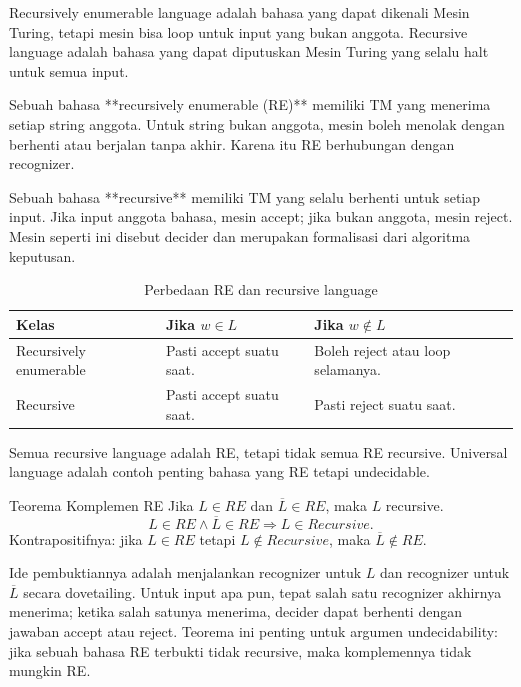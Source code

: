 \begin{jawab}
Recursively enumerable language adalah bahasa yang dapat dikenali Mesin Turing, tetapi mesin bisa loop untuk input yang bukan anggota. Recursive language adalah bahasa yang dapat diputuskan Mesin Turing yang selalu halt untuk semua input.
\end{jawab}

Sebuah bahasa **recursively enumerable (RE)** memiliki TM yang menerima setiap string anggota. Untuk string bukan anggota, mesin boleh menolak dengan berhenti atau berjalan tanpa akhir. Karena itu RE berhubungan dengan recognizer.

Sebuah bahasa **recursive** memiliki TM yang selalu berhenti untuk setiap input. Jika input anggota bahasa, mesin accept; jika bukan anggota, mesin reject. Mesin seperti ini disebut decider dan merupakan formalisasi dari algoritma keputusan.

\begin{table}[H]
\centering
\begin{tabularx}{\textwidth}{|L{0.26\textwidth}|X|X|}
\hline
\textbf{Kelas} & \textbf{Jika $w\in L$} & \textbf{Jika $w\notin L$} \\
\hline
Recursively enumerable & Pasti accept suatu saat. & Boleh reject atau loop selamanya. \\
\hline
Recursive & Pasti accept suatu saat. & Pasti reject suatu saat. \\
\hline
\end{tabularx}
\caption{Perbedaan RE dan recursive language}
\label{tab:re-recursive}
\end{table}

Semua recursive language adalah RE, tetapi tidak semua RE recursive. Universal language adalah contoh penting bahasa yang RE tetapi undecidable.

\begin{thm}{Teorema Komplemen RE}{}
Jika $L\in RE$ dan $\overline{L}\in RE$, maka $L$ recursive.
\[
    L\in RE \land \overline{L}\in RE \Rightarrow L\in Recursive.
\]
Kontrapositifnya: jika $L\in RE$ tetapi $L\notin Recursive$, maka $\overline{L}\notin RE$.
\end{thm}

Ide pembuktiannya adalah menjalankan recognizer untuk $L$ dan recognizer untuk $\overline{L}$ secara dovetailing. Untuk input apa pun, tepat salah satu recognizer akhirnya menerima; ketika salah satunya menerima, decider dapat berhenti dengan jawaban accept atau reject. Teorema ini penting untuk argumen undecidability: jika sebuah bahasa RE terbukti tidak recursive, maka komplemennya tidak mungkin RE.

